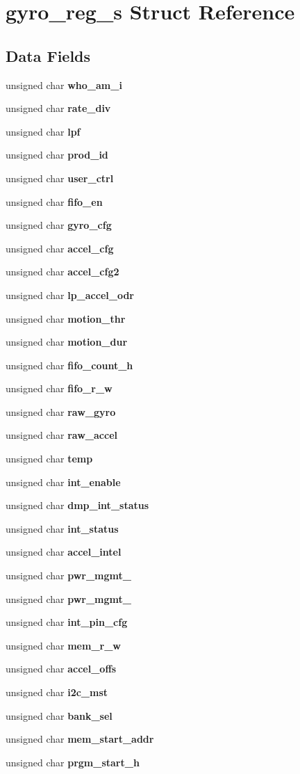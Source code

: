 \section{gyro\+\_\+reg\+\_\+s Struct Reference}
\label{structgyro__reg__s}
\subsection*{Data Fields}
\begin{DoxyCompactItemize}
\item 
unsigned char \textbf{ who\+\_\+am\+\_\+i}
\item 
unsigned char \textbf{ rate\+\_\+div}
\item 
unsigned char \textbf{ lpf}
\item 
unsigned char \textbf{ prod\+\_\+id}
\item 
unsigned char \textbf{ user\+\_\+ctrl}
\item 
unsigned char \textbf{ fifo\+\_\+en}
\item 
unsigned char \textbf{ gyro\+\_\+cfg}
\item 
unsigned char \textbf{ accel\+\_\+cfg}
\item 
unsigned char \textbf{ accel\+\_\+cfg2}
\item 
unsigned char \textbf{ lp\+\_\+accel\+\_\+odr}
\item 
unsigned char \textbf{ motion\+\_\+thr}
\item 
unsigned char \textbf{ motion\+\_\+dur}
\item 
unsigned char \textbf{ fifo\+\_\+count\+\_\+h}
\item 
unsigned char \textbf{ fifo\+\_\+r\+\_\+w}
\item 
unsigned char \textbf{ raw\+\_\+gyro}
\item 
unsigned char \textbf{ raw\+\_\+accel}
\item 
unsigned char \textbf{ temp}
\item 
unsigned char \textbf{ int\+\_\+enable}
\item 
unsigned char \textbf{ dmp\+\_\+int\+\_\+status}
\item 
unsigned char \textbf{ int\+\_\+status}
\item 
unsigned char \textbf{ accel\+\_\+intel}
\item 
unsigned char \textbf{ pwr\+\_\+mgmt\+\_}
\item 
unsigned char \textbf{ pwr\+\_\+mgmt\+\_}
\item 
unsigned char \textbf{ int\+\_\+pin\+\_\+cfg}
\item 
unsigned char \textbf{ mem\+\_\+r\+\_\+w}
\item 
unsigned char \textbf{ accel\+\_\+offs}
\item 
unsigned char \textbf{ i2c\+\_\+mst}
\item 
unsigned char \textbf{ bank\+\_\+sel}
\item 
unsigned char \textbf{ mem\+\_\+start\+\_\+addr}
\item 
unsigned char \textbf{ prgm\+\_\+start\+\_\+h}
\end{DoxyCompactItemize}


